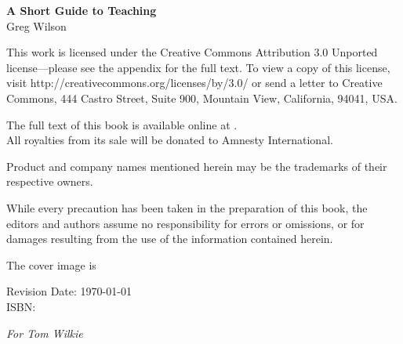 \thispagestyle{empty}
\mytitlepage

\newpage
\thispagestyle{empty}

\small

\noindent \textbf{A Short Guide to Teaching} \\
Greg Wilson

\vspace{0.3cm}

\noindent
This work is licensed under the Creative Commons Attribution 3.0
Unported license---please see the appendix for the full text.
To view a copy of this license, visit
http://creativecommons.org/licenses/by/3.0/ or send a letter to Creative
Commons, 444 Castro Street, Suite 900, Mountain View, California,
94041, USA.

\vspace{0.3cm}

\noindent
The full text of this book is available online at .\\
All royalties from its sale will be donated to Amnesty International.\\

\vfill

\noindent
Product and company names mentioned herein may be the trademarks of
their respective owners.\\

\vspace{0.3cm}

\noindent
While every precaution has been taken in the preparation of this
book, the editors and authors assume no responsibility for errors or omissions,
or for damages resulting from the use of the information contained herein.\\

\vspace{0.3cm}

\noindent
The cover image is \\

\vspace{1cm}

\noindent
Revision Date: \today \\

\noindent
ISBN: 

\newpage
\normalsize
\thispagestyle{empty}
\begin{vplace}
\centerline{\emph{For Tom Wilkie}}
\end{vplace}


\renewcommand{\thepage}{\roman{page}}
\newpage
\tableofcontents
\newpage
\listoffigures
\newpage
\listoftables

\newpage
\renewcommand{\thepage}{\arabic{page}}
\setcounter{page}{1}
